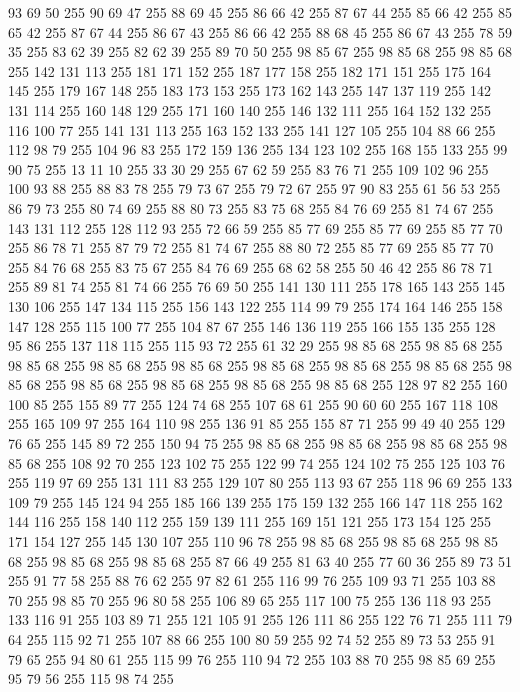93 69 50 255 90 69 47 255 88 69 45 255 86 66 42 255 87 67 44 255 85 66 42 255 85 65 42 255 87 67 44 255 86 67 43 255 86 66 42 255 88 68 45 255 86 67 43 255 78 59 35 255 83 62 39 255 82 62 39 255 89 70 50 255 98 85 67 255 98 85 68 255 98 85 68 255 142 131 113 255 181 171 152 255 187 177 158 255 182 171 151 255 175 164 145 255 179 167 148 255 183 173 153 255 173 162 143 255 147 137 119 255 142 131 114 255 160 148 129 255 171 160 140 255 146 132 111 255 164 152 132 255 116 100 77 255 141 131 113 255 163 152 133 255 141 127 105 255 104 88 66 255 112 98 79 255 104 96 83 255 172 159 136 255 134 123 102 255 168 155 133 255 99 90 75 255 13 11 10 255 33 30 29 255 67 62 59 255 83 76 71 255 109 102 96 255 100 93 88 255 88 83 78 255 79 73 67 255 79 72 67 255 97 90 83 255 61 56 53 255 86 79 73 255 80 74 69 255 88 80 73 255 83 75 68 255 84 76 69 255 81 74 67 255 143 131 112 255 128 112 93 255 72 66 59 255
85 77 69 255 85 77 69 255 85 77 70 255 86 78 71 255 87 79 72 255 81 74 67 255 88 80 72 255 85 77 69 255 85 77 70 255 84 76 68 255 83 75 67 255 84 76 69 255 68 62 58 255 50 46 42 255 86 78 71 255 89 81 74 255 81 74 66 255 76 69 50 255 141 130 111 255 178 165 143 255 145 130 106 255 147 134 115 255 156 143 122 255 114 99 79 255 174 164 146 255 158 147 128 255 115 100 77 255 104 87 67 255 146 136 119 255 166 155 135 255 128 95 86 255 137 118 115 255 115 93 72 255 61 32 29 255 98 85 68 255 98 85 68 255 98 85 68 255 98 85 68 255 98 85 68 255 98 85 68 255 98 85 68 255 98 85 68 255 98 85 68 255 98 85 68 255 98 85 68 255 98 85 68 255 98 85 68 255 128 97 82 255 160 100 85 255 155 89 77 255 124 74 68 255 107 68 61 255 90 60 60 255 167 118 108 255 165 109 97 255 164 110 98 255 136 91 85 255 155 87 71 255 99 49 40 255 129 76 65 255 145 89 72 255 150 94 75 255 98 85 68 255 98 85 68 255
98 85 68 255 98 85 68 255 108 92 70 255 123 102 75 255 122 99 74 255 124 102 75 255 125 103 76 255 119 97 69 255 131 111 83 255 129 107 80 255 113 93 67 255 118 96 69 255 133 109 79 255 145 124 94 255 185 166 139 255 175 159 132 255 166 147 118 255 162 144 116 255 158 140 112 255 159 139 111 255 169 151 121 255 173 154 125 255 171 154 127 255 145 130 107 255 110 96 78 255 98 85 68 255 98 85 68 255 98 85 68 255 98 85 68 255 98 85 68 255 87 66 49 255 81 63 40 255 77 60 36 255 89 73 51 255 91 77 58 255 88 76 62 255 97 82 61 255 116 99 76 255 109 93 71 255 103 88 70 255 98 85 70 255 96 80 58 255 106 89 65 255 117 100 75 255 136 118 93 255 133 116 91 255 103 89 71 255 121 105 91 255 126 111 86 255 122 76 71 255 111 79 64 255 115 92 71 255 107 88 66 255 100 80 59 255 92 74 52 255 89 73 53 255 91 79 65 255 94 80 61 255 115 99 76 255 110 94 72 255 103 88 70 255 98 85 69 255 95 79 56 255 115 98 74 255
